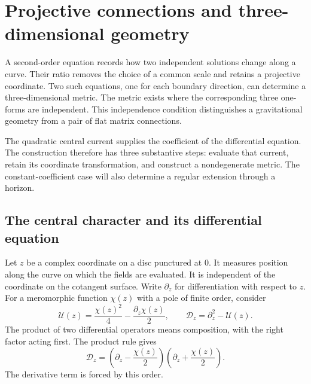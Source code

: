 \chapter{Projective connections and three-dimensional geometry}
\label{ch:projective-gravity}

A second-order equation records how two independent solutions change along a curve.
Their ratio removes the choice of a common scale and retains a projective coordinate.
Two such equations, one for each boundary direction, can determine a three-dimensional metric.
The metric exists where the corresponding three one-forms are independent.
This independence condition distinguishes a gravitational geometry from a pair of flat matrix connections.

The quadratic central current supplies the coefficient of the differential equation.
The construction therefore has three substantive steps: evaluate that current, retain its coordinate transformation, and construct a nondegenerate metric.
The constant-coefficient case will also determine a regular extension through a horizon.

\section{The central character and its differential equation}

Let $z$ be a complex coordinate on a disc punctured at $0$.
It measures position along the curve on which the fields are evaluated.
It is independent of the coordinate on the cotangent surface.
Write $\partial_z$ for differentiation with respect to $z$.
For a meromorphic function $\chi(z)$ with a pole of finite order, consider
\[
 \mathcal U(z)=\frac{\chi(z)^2}{4}-\frac{\partial_z\chi(z)}2,
 \qquad \mathscr D_z=\partial_z^2-\mathcal U(z).
\]
The product of two differential operators means composition, with the right factor acting first.
The product rule gives
\begin{equation}\label{eq:pg-miura}
 \mathscr D_z=
 \left(\partial_z-\frac{\chi(z)}2\right)
 \left(\partial_z+\frac{\chi(z)}2\right).
\end{equation}
The derivative term is forced by this order.

